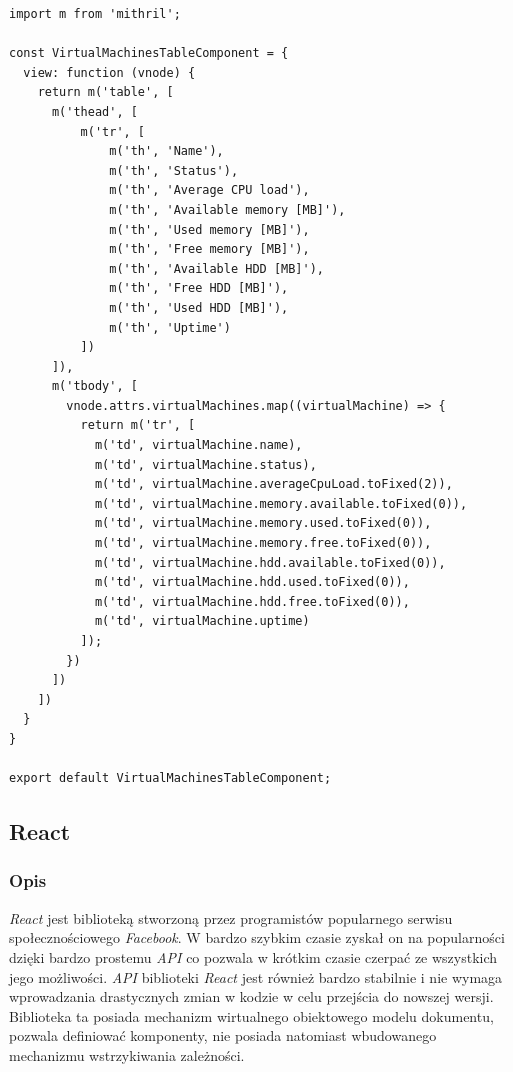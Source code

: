 \documentclass[polish, twoside, 12pt]{mwart}
\begin{document}
\begin{lstlisting}[caption=Komponent tabeli, label={lst:mithril-table}]
import m from 'mithril';

const VirtualMachinesTableComponent = {
  view: function (vnode) {
    return m('table', [
      m('thead', [
          m('tr', [
              m('th', 'Name'),
              m('th', 'Status'),
              m('th', 'Average CPU load'),
              m('th', 'Available memory [MB]'),
              m('th', 'Used memory [MB]'),
              m('th', 'Free memory [MB]'),
              m('th', 'Available HDD [MB]'),
              m('th', 'Free HDD [MB]'),
              m('th', 'Used HDD [MB]'),
              m('th', 'Uptime')
          ])
      ]),
      m('tbody', [
        vnode.attrs.virtualMachines.map((virtualMachine) => {
          return m('tr', [
            m('td', virtualMachine.name),
            m('td', virtualMachine.status),
            m('td', virtualMachine.averageCpuLoad.toFixed(2)),
            m('td', virtualMachine.memory.available.toFixed(0)),
            m('td', virtualMachine.memory.used.toFixed(0)),
            m('td', virtualMachine.memory.free.toFixed(0)),
            m('td', virtualMachine.hdd.available.toFixed(0)),
            m('td', virtualMachine.hdd.used.toFixed(0)),
            m('td', virtualMachine.hdd.free.toFixed(0)),
            m('td', virtualMachine.uptime)
          ]);
        })
      ])
    ])
  }
}

export default VirtualMachinesTableComponent;
\end{lstlisting}

\subsection{React}

\subsubsection{Opis}

\emph{React} \cite{react} jest biblioteką stworzoną przez programistów popularnego serwisu społecznościowego \emph{Facebook}. W bardzo szybkim czasie zyskał on na popularności dzięki bardzo prostemu \emph{API} co pozwala w krótkim czasie czerpać ze wszystkich jego możliwości. \emph{API} biblioteki \emph{React} jest również bardzo stabilnie i nie wymaga wprowadzania drastycznych zmian w kodzie w celu przejścia do nowszej wersji. Biblioteka ta posiada mechanizm wirtualnego obiektowego modelu dokumentu, pozwala definiować komponenty, nie posiada natomiast wbudowanego mechanizmu wstrzykiwania zależności.
\end{document}
